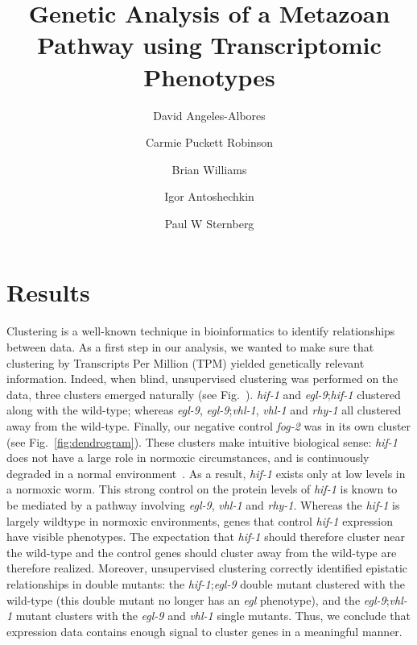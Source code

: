 \documentclass[9pt,twocolumn,twoside]{pnas-new}
\title{Genetic Analysis of a Metazoan Pathway using Transcriptomic Phenotypes}
\author[a,b]{David Angeles-Albores}
\author[a,b]{Carmie Puckett Robinson}
\author[a]{Brian Williams}
\author[a]{Igor Antoshechkin}
\author[a,b]{Paul W Sternberg}
\affil[a]{Department of Biology and Biological Engineering, Caltech, Pasadena, USA, 91125}
\affil[b]{Howard Hughes Medical Institute}
\newcommand{\egl}{\emph{egl-9}}
\newcommand{\rhy}{\emph{rhy-1}}
\newcommand{\vhl}{\emph{vhl-1}}
\newcommand{\hif}{\emph{hif-1}}
\newcommand{\fog}{\emph{fog-2}}
\begin{document}
\verticaladjustment{-2pt}

\maketitle
\thispagestyle{firststyle}


\section*{Results}
Clustering is a well-known technique in bioinformatics to identify relationships between data. As a first step in our analysis, we wanted to make sure that clustering by Transcripts Per Million (TPM) yielded genetically relevant information. Indeed, when blind, unsupervised clustering was performed on the data, three clusters emerged naturally (see Fig.~). \hif{} and \egl{};\hif{} clustered along with the wild-type; whereas \egl{}, \egl{};\vhl{}, \vhl{} and \rhy{} all clustered away from the wild-type. Finally, our negative control \fog{} was in its own cluster (see Fig.~\ref{fig:dendrogram}). These clusters make intuitive biological sense:
\hif{} does not have a large role in normoxic circumstances, and is continuously degraded in a normal environment~\cite{}. As a result, \hif{} exists only at low levels in a normoxic worm. This strong control on the protein levels of \hif{} is known to be mediated by a pathway involving \egl{}, \vhl{} and \rhy{}. Whereas the \hif{} is largely wildtype in normoxic environments, genes that control \hif{} expression have visible phenotypes. The expectation that \hif{} should therefore cluster near the wild-type and the control genes should cluster away from the wild-type are therefore realized. Moreover, unsupervised clustering correctly identified epistatic relationships in double mutants: the \hif{};\egl{} double mutant clustered with the wild-type (this double mutant no longer has an \emph{egl} phenotype), and the \egl{};\vhl{} mutant clusters with the \egl{} and \vhl{} single mutants.
Thus, we conclude that expression data contains enough signal to cluster genes in a meaningful manner.
\end{document}
